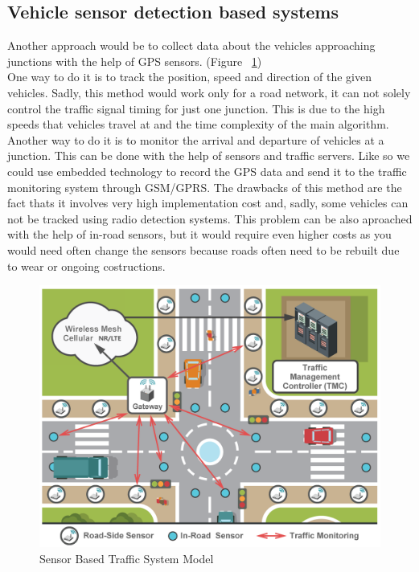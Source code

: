 \documentclass[17pt]{article}
\begin{document}
\subsection{Vehicle sensor detection based systems}
\indent \indent
Another approach would be to collect data about the vehicles 
approaching junctions with the help of GPS sensors.
(Figure ~\ref{fig:SensorRecognitionSystem})\\
\indent \indent
One way to do it is to track the position, speed and direction of the given
vehicles. Sadly, this method would work only for a road network,
it can not solely control the traffic signal timing for just one junction. 
This is due to the high speeds that vehicles travel at and the time 
complexity of the  main algorithm.\\ 
\indent \indent
Another way to do it is to monitor the arrival and departure of vehicles at a
junction. This can be done with the help of sensors and traffic servers.
Like so we could use embedded technology to record the GPS data and send it to
the traffic monitoring system through GSM/GPRS. The drawbacks of this method
are the fact thats it involves very high implementation cost and, sadly, some
vehicles can not be tracked using radio detection systems. This problem can
be also aproached with the help of in-road sensors, but it would require even higher 
costs as you would need often change the sensors because roads often need to be
rebuilt due to wear or ongoing costructions.

\begin{figure}[h!]
    \includegraphics[width=\textwidth]{SensorsBasedTrafficControlSystemRepresentation.png}
    \caption{Sensor Based Traffic System Model \textcopyright}
    \label{fig:SensorRecognitionSystem}
\end{figure}
\end{document}
